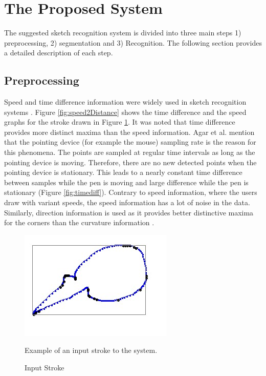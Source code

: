 \documentclass{article}
\begin{document}
\section{The Proposed System}
\label{Sysdisc}
 The suggested sketch recognition system is divided into three main steps 1) preprocessing, 2) segmentation and 3) Recognition. The following section provides a detailed description of each step.
 
\subsection{Preprocessing}
\label{Prepross}%
 Speed and time difference information were widely used in sketch recognition systems \cite{earlyprocess}. Figure \ref{fig:speed2Distance} shows the time difference and the speed graphs for the stroke drawn in Figure \ref{fig:orignalStroke}. It was noted that time difference provides more distinct maxima than the speed information. Agar et al. \cite{polygonfeedback31} mention that the pointing device (for example the mouse) sampling rate is the reason for this phenomena. The points are sampled at regular time intervals as long as the pointing device is moving. Therefore, there are no new detected points when the pointing device is stationary. This leads to a nearly constant time difference between samples while the pen is moving and large difference while the pen is stationary (Figure \ref{fig:timediff}). Contrary to speed information, where the users draw with variant speeds, the speed information has a lot of noise in the data.  Similarly, direction information is used as it provides better distinctive maxima for the corners than the curvature information \cite{meanshift10}.%
 \begin{figure}[h]
	\centering
		\includegraphics[scale=0.5]{images/stroke3.jpg}
	\caption{Input Stroke} Example of an input stroke to the system. 
	\label{fig:orignalStroke}
\end{figure}
\end{document}
